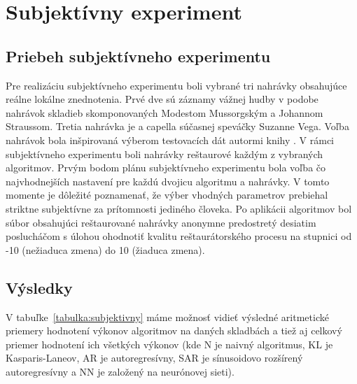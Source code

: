 
\chapter{Subjektívny experiment}

\section{Priebeh subjektívneho experimentu}
Pre realizáciu subjektívneho experimentu boli vybrané tri nahrávky obsahujúce reálne lokálne znednotenia. Prvé dve sú záznamy vážnej hudby v podobe nahrávok skladieb skomponovaných Modestom Mussorgským a Johannom Straussom. Tretia nahrávka je a capella súčasnej speváčky Suzanne Vega. Voľba nahrávok bola inšpirovaná výberom testovacích dát autormi knihy \cite{Godsill}. V rámci subjektívneho experimentu boli nahrávky reštaurové každým z vybraných algoritmov. Prvým bodom plánu subjektívneho experimentu bola voľba čo najvhodnejších nastavení pre každú dvojicu algoritmu a nahrávky. V tomto momente je dôležité poznamenať, že výber vhodných parametrov prebiehal striktne subjektívne za prítomnosti jediného človeka. Po aplikácii algoritmov bol súbor obsahujúci reštaurované nahrávky anonymne predostretý desiatim poslucháčom s úlohou ohodnotiť kvalitu reštaurátorského procesu na stupnici od -10 (nežiaduca zmena) do 10 (žiaduca zmena).

\section{Výsledky}
V tabuľke~\ref{tabulka:subjektivny} máme možnosť vidieť výsledné aritmetické priemery hodnotení výkonov algoritmov na daných skladbách a tiež aj celkový priemer hodnotení ich všetkých výkonov (kde N je naivný algoritmus, KL je Kasparis-Laneov, AR je autoregresívny, SAR je sínusoidovo rozšírený autoregresívny a NN je založený na neurónovej sieti).

